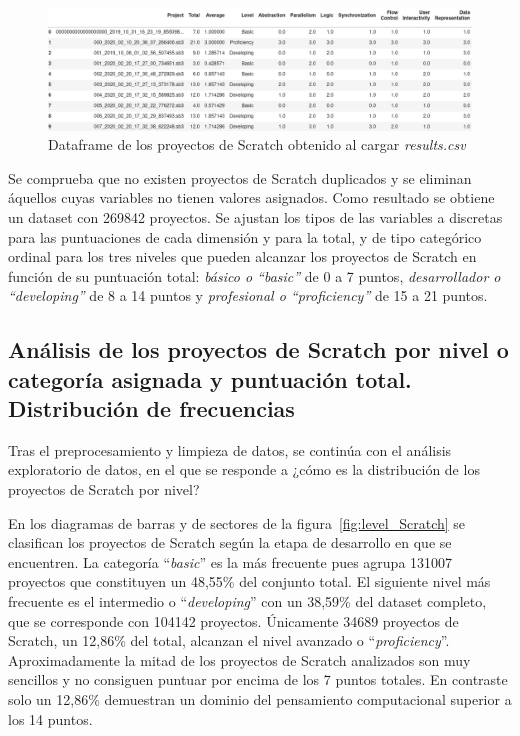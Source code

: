 \documentclass[a4paper, 12pt]{book}
\begin{document}
\begin{figure}[H]
    \centering
    \includegraphics[width=1.0\textwidth]{img/df_origen_Scratch.png}
    \caption{Dataframe de los proyectos de Scratch obtenido al cargar \emph{results.csv}}\label{fig:df_Scratch}
\end{figure}

Se comprueba que no existen proyectos de Scratch duplicados y se eliminan áquellos cuyas variables no tienen valores asignados. Como resultado se obtiene un dataset con 269842 proyectos. Se ajustan los tipos de las variables a discretas para las puntuaciones de cada dimensión y para la total, y de tipo categórico ordinal para los tres niveles que pueden alcanzar los proyectos de Scratch en función de su puntuación total: \emph{ básico o ``basic''} de 0 a 7 puntos, \emph{desarrollador o ``developing''} de 8 a 14 puntos y \emph{profesional o ``proficiency''} de 15 a 21 puntos. 

\subsection{Análisis de los proyectos de Scratch por nivel o categoría asignada y puntuación total. Distribución de frecuencias}
\label{subsec:frec_nivel}

Tras el preprocesamiento y limpieza de datos, se continúa con el análisis exploratorio de datos, en el que se responde a ¿cómo es la distribución de los proyectos de Scratch por nivel? 

En los diagramas de barras y de sectores de la figura~\ref{fig:level_Scratch} se clasifican los proyectos de Scratch según la etapa de desarrollo en que se encuentren. La categoría ``\emph{basic}'' es la más frecuente pues agrupa 131007 proyectos que constituyen un 48,55\% del conjunto total. El siguiente nivel más frecuente es el intermedio o ``\emph{developing}'' con un 38,59\% del dataset completo, que se corresponde con 104142 proyectos. Únicamente 34689 proyectos de Scratch, un 12,86\% del total, alcanzan el nivel avanzado o ``\emph{proficiency}''. Aproximadamente la mitad de los proyectos de Scratch analizados son muy sencillos y no consiguen puntuar por encima de los 7 puntos totales. En contraste solo un 12,86\% demuestran un dominio del pensamiento computacional superior a los 14 puntos.
\end{document}
